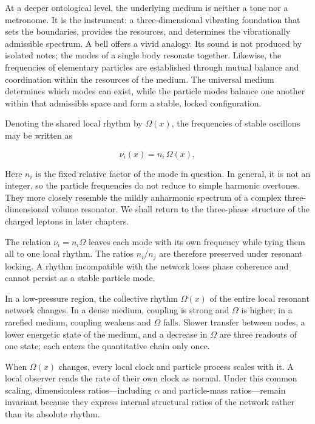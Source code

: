 \documentclass[11pt,a4paper]{article}
\begin{document}
At a deeper ontological level, the underlying medium is neither a tone nor a metronome. It is the instrument: a three-dimensional vibrating foundation that sets the boundaries, provides the resources, and determines the vibrationally admissible spectrum. A bell offers a vivid analogy. Its sound is not produced by isolated notes; the modes of a single body resonate together. Likewise, the frequencies of elementary particles are established through mutual balance and coordination within the resources of the medium. The universal medium determines which modes can exist, while the particle modes balance one another within that admissible space and form a stable, locked configuration.

Denoting the shared local rhythm by $\Omega(x)$, the frequencies of stable oscillons may be written as

\begin{equation}
\nu_i(x)=n_i\,\Omega(x),
\label{eq:population-locking}
\end{equation}

Here $n_i$ is the fixed relative factor of the mode in question. In general, it is not an integer, so the particle frequencies do not reduce to simple harmonic overtones. They more closely resemble the mildly anharmonic spectrum of a complex three-dimensional volume resonator. We shall return to the three-phase structure of the charged leptons in later chapters.

The relation $\nu_i=n_i\Omega$ leaves each mode with its own frequency while tying them all to one local rhythm. The ratios $n_i/n_j$ are therefore preserved under resonant locking. A rhythm incompatible with the network loses phase coherence and cannot persist as a stable particle mode.

In a low-pressure region, the collective rhythm $\Omega(x)$ of the entire local resonant network changes. In a dense medium, coupling is strong and $\Omega$ is higher; in a rarefied medium, coupling weakens and $\Omega$ falls. Slower transfer between nodes, a lower energetic state of the medium, and a decrease in $\Omega$ are three readouts of one state; each enters the quantitative chain only once.

When $\Omega(x)$ changes, every local clock and particle process scales with it. A local observer reads the rate of their own clock as normal. Under this common scaling, dimensionless ratios---including $\alpha$ and particle-mass ratios---remain invariant because they express internal structural ratios of the network rather than its absolute rhythm.
\end{document}
